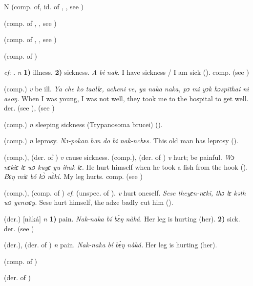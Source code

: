 \begin{letter}{N}
 (comp. of, id. of , , see ) 

 (comp. of , , see ) 

 (comp. of , , see ) 

 (comp. of ) 

 \textit{cf}: . \textit{n} \textbf{1)} illness. \textbf{2)} sickness. \textit{A bi nak.} I have sickness / I am sick (\citealt{Pichl1967}). comp.  (see )

 (comp.) \textit{v} be ill. \textit{Ya che ko taallɛ, acheni ve, ya naka naka, pɔ mi yɔk hɔspithai ni asoŋ.} When I was young, I was not well, they took me to the hospital to get well. der.  (see ),  (see )

 (comp.) \textit{n} sleeping sickness (Trypanosoma brucei) (\citealt{Pichl1967}).

 (comp.) \textit{n} leprosy. \textit{Nɔ-pokan bən do bi nak-nchɛs.} This old man has leprosy (\citealt{Pichl1967}). 

 (comp.), (der. of ) \textit{v} cause sickness.
 (comp.), (der. of ) \textit{v} hurt; be painful. \textit{Wɔ nɛkiɛ lɛ wɔ kuyɛ yu ihuk lɛ.} He hurt himself when he took a fish from the hook (\citealt{Pichl1967}). \textit{Bɛŋ miɛ bó kɔ̀ nɛ̀kí.} My leg hurts. comp.  (see )

 (comp.), (comp. of ) \textit{cf}:  (unspec. of ). \textit{v} hurt oneself. \textit{Sese theyɛn-nɛki, thɔ lɛ kəth wɔ yenwɛy.} Sese hurt himself, the adze badly cut him (\citealt{Pichl1967}).

 (der.) [nàká] \textit{n} \textbf{1)} pain. \textit{Nak-naka bí bɛ̀ŋ nàká.} Her leg is hurting (her). \textbf{2)} sick. der.  (see )

 (der.), (der. of ) \textit{n} pain. \textit{Nak-naka bí bɛ̀ŋ nàká.} Her leg is hurting (her). 

 (comp. of )

 (der. of )


\end{letter}
